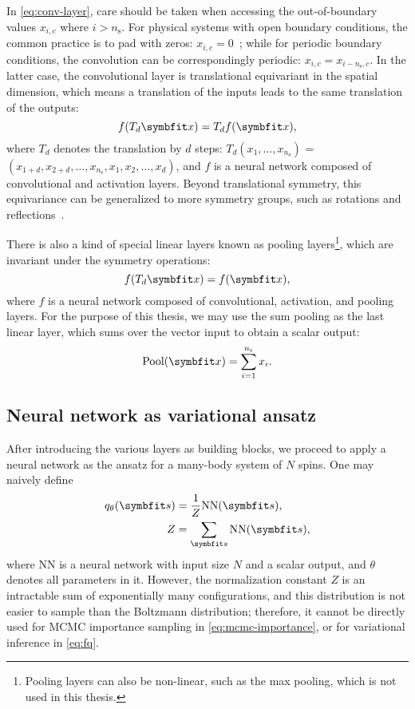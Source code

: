 In \cref{eq:conv-layer}, care should be taken when accessing the out-of-boundary values $x_{i, c}$ where $i > n_\text{s}$. For physical systems with open boundary conditions, the common practice is to pad with zeros: $x_{i, c} = 0$~\cite{islam2020much}; while for periodic boundary conditions, the convolution can be correspondingly periodic: $x_{i, c} = x_{i - n_\text{s}, c}$. In the latter case, the convolutional layer is translational equivariant in the spatial dimension, which means a translation of the inputs leads to the same translation of the outputs:
\begin{equation}
f(T_d \vx) = T_d f(\vx),
\end{equation}
where $T_d$ denotes the translation by $d$ steps: $T_d (x_1, \ldots, x_{n_\text{s}})$ = $(x_{1 + d}, x_{2 + d}, \ldots, x_{n_\text{s}}, x_1, x_2, \ldots, x_d)$, and $f$ is a neural network composed of convolutional and activation layers. Beyond translational symmetry, this equivariance can be generalized to more symmetry groups, such as rotations and reflections~\cite{luo2021gauge, roth2021group}.

There is also a kind of special linear layers known as pooling layers\footnote{Pooling layers can also be non-linear, such as the max pooling, which is not used in this thesis.}, which are invariant under the symmetry operations:
\begin{equation}
f(T_d \vx) = f(\vx),
\label{eq:trans-invar}
\end{equation}
where $f$ is a neural network composed of convolutional, activation, and pooling layers. For the purpose of this thesis, we may use the sum pooling as the last linear layer, which sums over the vector input to obtain a scalar output:
\begin{equation}
\text{Pool}(\vx) = \sum_{i = 1}^{n_\text{s}} x_i.
\end{equation}

\subsection{Neural network as variational ansatz}

After introducing the various layers as building blocks, we proceed to apply a neural network as the ansatz for a many-body system of $N$ spins. One may naively define
\begin{align}
q_\theta(\vs) &= \frac{1}{Z} \text{NN}(\vs), \\
Z &= \sum_\vs \text{NN}(\vs),
\end{align}
where NN is a neural network with input size $N$ and a scalar output, and $\theta$ denotes all parameters in it. However, the normalization constant $Z$ is an intractable sum of exponentially many configurations, and this distribution is not easier to sample than the Boltzmann distribution; therefore, it cannot be directly used for MCMC importance sampling in \cref{eq:mcmc-importance}, or for variational inference in \cref{eq:fq}.

